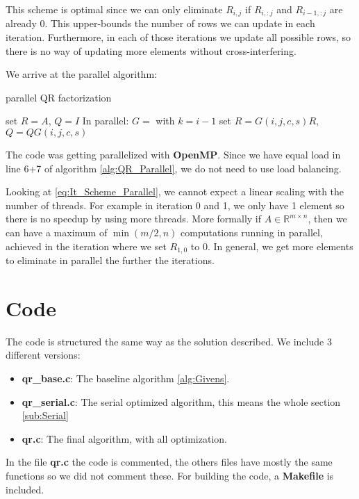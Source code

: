 \documentclass[a4paper]{scrartcl}
\begin{document}
        This scheme is optimal since we can only eliminate $R_{i,j}$ if $R_{i,
        :j}$ and $R_{i-1, :j}$ are already 0. This upper-bounds the number of
        rows we can update in each iteration. Furthermore, in each of those
        iterations we update all possible rows, so there is no way of updating
        more elements without cross-interfering.

        We arrive at the parallel algorithm:
        \begin{algorithm}[H]
            \caption{parallel QR factorization }\label{alg:QR_Parallel}
            \begin{algorithmic}[1]
                    \State set $R=A$, $Q=I$
                        \State In parallel:
                            \State $G =$  with $k=i-1$
                            \State set $R=G(i,j,c,s) R$, $Q = Q G(i,j,c,s)$
                        \EndFor
                    \EndFor
                \EndProcedure
            \end{algorithmic}
        \end{algorithm}

        The code was getting parallelized with \textbf{OpenMP}. Since we
        have equal load in line 6+7 of algorithm \ref{alg:QR_Parallel},
        we do not need to use load balancing.

        Looking at \ref{eq:It_Scheme_Parallel}, we cannot expect a linear
        scaling with the number of threads. For example in iteration 0 and 1, we
        only have 1 element so there is no speedup by using more threads. More
        formally if $A \in \mathbb{R}^{m\times n}$, then we can have a maximum
        of $\min(m/2, n)$ computations running in parallel, achieved in the
        iteration where we set $R_{1,0}$ to 0. In general, we get more elements
        to eliminate in parallel the further the iterations.



\section{Code}
    The code is structured the same way as the solution described. We include 3 different versions:
    \begin{itemize}
        \item \textbf{qr\_base.c}: The baseline algorithm \ref{alg:Givens}.
        \item \textbf{qr\_serial.c}: The serial optimized algorithm, this means the whole section \ref{sub:Serial}
        \item \textbf{qr.c}: The final algorithm, with all optimization.
    \end{itemize}
    In the file \textbf{qr.c} the code is commented, the others files have
    mostly the same functions so we did not comment these. For building the
    code, a \textbf{Makefile} is included.
\end{document}
